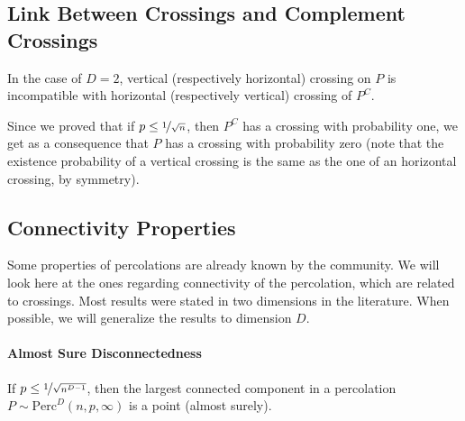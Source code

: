 \subsection{Link Between Crossings and Complement Crossings}
In the case of $D=2$, vertical (respectively horizontal) crossing on $P$ is incompatible with horizontal (respectively vertical) crossing of $P^C$.

Since we proved that if $p \leq \nicefrac{1}{\sqrt{n}}$, then $P^C$ has a crossing with probability one, we get as a consequence that $P$ has a crossing with probability zero (note that the existence probability of a vertical crossing is the same as the one of an horizontal crossing, by symmetry).

\subsection{Connectivity Properties}
Some properties of percolations are already known by the community.
We will look here at the ones regarding connectivity of the percolation, which are related to crossings.
Most results were stated in two dimensions in the literature.
When possible, we will generalize the results to dimension $D$.

\paragraph{Almost Sure Disconnectedness}
If $p \leq \nicefrac{1}{\sqrt{n^{D-1}}}$, then the largest connected component in a percolation $P \sim \text{Perc}^D(n,p,\infty)$ is a point (almost surely).

